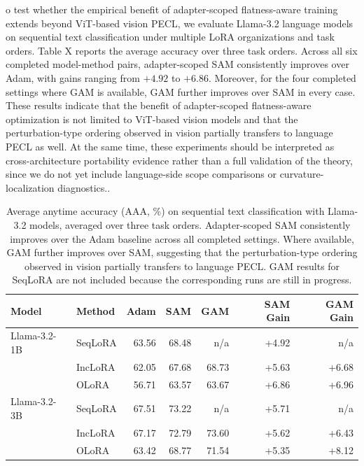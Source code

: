 \documentclass[10pt]{article} %
\begin{document}
o test whether the empirical benefit of adapter-scoped flatness-aware training extends beyond ViT-based vision PECL, we evaluate Llama-3.2 language models on sequential text classification under multiple LoRA organizations and task orders. Table X reports the average accuracy over three task orders. Across all six completed model-method pairs, adapter-scoped SAM consistently improves over Adam, with gains ranging from $+4.92$ to $+6.86$. Moreover, for the four completed settings where GAM is available, GAM further improves over SAM in every case. These results indicate that the benefit of adapter-scoped flatness-aware optimization is not limited to ViT-based vision models and that the perturbation-type ordering observed in vision partially transfers to language PECL as well. At the same time, these experiments should be interpreted as cross-architecture portability evidence rather than a full validation of the theory, since we do not yet include language-side scope comparisons or curvature-localization diagnostics..
\begin{table}[t]
\centering
\caption{
Average anytime accuracy (AAA, \%) on sequential text classification with Llama-3.2 models, averaged over three task orders.
Adapter-scoped SAM consistently improves over the Adam baseline across all completed settings.
Where available, GAM further improves over SAM, suggesting that the perturbation-type ordering observed in vision partially transfers to language PECL.
GAM results for SeqLoRA are not included because the corresponding runs are still in progress.
}
\label{tab:llama_results}
\setlength{\tabcolsep}{4pt}
\renewcommand{\arraystretch}{0.95}
\footnotesize
\begin{tabular}{@{}l l r r r r r@{}}
\toprule
\textbf{Model} & \textbf{Method} & \textbf{Adam} & \textbf{SAM} & \textbf{GAM} & \textbf{SAM Gain} & \textbf{GAM Gain} \\
\midrule
Llama-3.2-1B & SeqLoRA & 63.56 & 68.48 & n/a  & +4.92 & n/a  \\
 & IncLoRA & 62.05 & 67.68 & 68.73 & +5.63 & +6.68 \\
 & OLoRA   & 56.71 & 63.57 & 63.67 & +6.86 & +6.96 \\
\midrule
Llama-3.2-3B & SeqLoRA & 67.51 & 73.22 & n/a  & +5.71 & n/a  \\
 & IncLoRA & 67.17 & 72.79 & 73.60 & +5.62 & +6.43 \\
 & OLoRA   & 63.42 & 68.77 & 71.54 & +5.35 & +8.12 \\
\bottomrule
\end{tabular}
\end{table}
\end{document}
